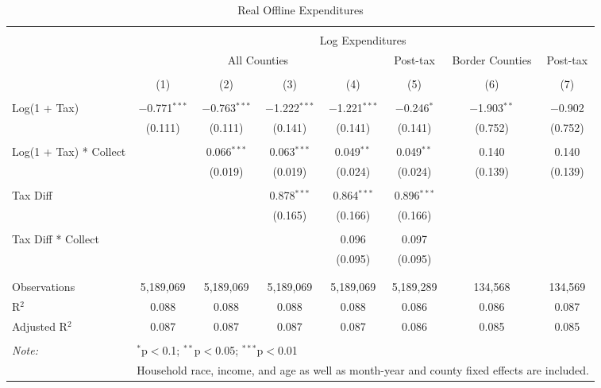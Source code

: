 
\begin{table}[!htbp] \centering 
  \caption{Real Offline Expenditures} 
  \label{} 
\begin{tabular}{@{\extracolsep{5pt}}lccccccc} 
\\[-1.8ex]\hline 
\hline \\[-1.8ex] 
 & \multicolumn{7}{c}{Log Expenditures} \\ 
\cline{2-8} 
 & \multicolumn{4}{c}{All Counties} & Post-tax & Border Counties & Post-tax \\ 
\\[-1.8ex] & (1) & (2) & (3) & (4) & (5) & (6) & (7)\\ 
\hline \\[-1.8ex] 
 Log(1 + Tax) & $-$0.771$^{***}$ & $-$0.763$^{***}$ & $-$1.222$^{***}$ & $-$1.221$^{***}$ & $-$0.246$^{*}$ & $-$1.903$^{**}$ & $-$0.902 \\ 
  & (0.111) & (0.111) & (0.141) & (0.141) & (0.141) & (0.752) & (0.752) \\ 
  & & & & & & & \\ 
 Log(1 + Tax) * Collect &  & 0.066$^{***}$ & 0.063$^{***}$ & 0.049$^{**}$ & 0.049$^{**}$ & 0.140 & 0.140 \\ 
  &  & (0.019) & (0.019) & (0.024) & (0.024) & (0.139) & (0.139) \\ 
  & & & & & & & \\ 
 Tax Diff &  &  & 0.878$^{***}$ & 0.864$^{***}$ & 0.896$^{***}$ &  &  \\ 
  &  &  & (0.165) & (0.166) & (0.166) &  &  \\ 
  & & & & & & & \\ 
 Tax Diff * Collect &  &  &  & 0.096 & 0.097 &  &  \\ 
  &  &  &  & (0.095) & (0.095) &  &  \\ 
  & & & & & & & \\ 
\hline \\[-1.8ex] 
Observations & 5,189,069 & 5,189,069 & 5,189,069 & 5,189,069 & 5,189,289 & 134,568 & 134,569 \\ 
R$^{2}$ & 0.088 & 0.088 & 0.088 & 0.088 & 0.086 & 0.086 & 0.087 \\ 
Adjusted R$^{2}$ & 0.087 & 0.087 & 0.087 & 0.087 & 0.086 & 0.085 & 0.085 \\ 
\hline 
\hline \\[-1.8ex] 
\textit{Note:}  & \multicolumn{7}{l}{$^{*}$p$<$0.1; $^{**}$p$<$0.05; $^{***}$p$<$0.01} \\ 
 & \multicolumn{7}{l}{Household race, income, and age as well as month-year and county fixed effects are included.} \\ 
\end{tabular} 
\end{table} 
